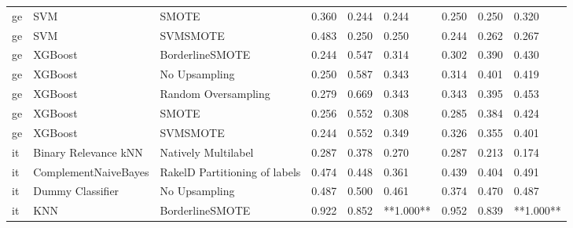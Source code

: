 \begin{tabular}{lllllllll}
      ge &                             SVM &                         SMOTE & 0.360 &                     0.244 &                 0.244 &                  0.250 &                                   0.250 &     0.320 \\
      ge &                             SVM &                      SVMSMOTE & 0.483 &                     0.250 &                 0.250 &                  0.244 &                                   0.262 &     0.267 \\
      ge &                         XGBoost &               BorderlineSMOTE & 0.244 &                     0.547 &                 0.314 &                  0.302 &                                   0.390 &     0.430 \\
      ge &                         XGBoost &                 No Upsampling & 0.250 &                     0.587 &                 0.343 &                  0.314 &                                   0.401 &     0.419 \\
      ge &                         XGBoost &           Random Oversampling & 0.279 &                     0.669 &                 0.343 &                  0.343 &                                   0.395 &     0.453 \\
      ge &                         XGBoost &                         SMOTE & 0.256 &                     0.552 &                 0.308 &                  0.285 &                                   0.384 &     0.424 \\
      ge &                         XGBoost &                      SVMSMOTE & 0.244 &                     0.552 &                 0.349 &                  0.326 &                                   0.355 &     0.401 \\
      it &            Binary Relevance kNN &           Natively Multilabel & 0.287 &                     0.378 &                 0.270 &                  0.287 &                                   0.213 &     0.174 \\
      it &            ComplementNaiveBayes & RakelD Partitioning of labels & 0.474 &                     0.448 &                 0.361 &                  0.439 &                                   0.404 &     0.491 \\
      it &                Dummy Classifier &                 No Upsampling & 0.487 &                     0.500 &                 0.461 &                  0.374 &                                   0.470 &     0.487 \\
      it &                             KNN &               BorderlineSMOTE & 0.922 &                     0.852 &             **1.000** &                  0.952 &                                   0.839 & **1.000** \\

\end{tabular}
